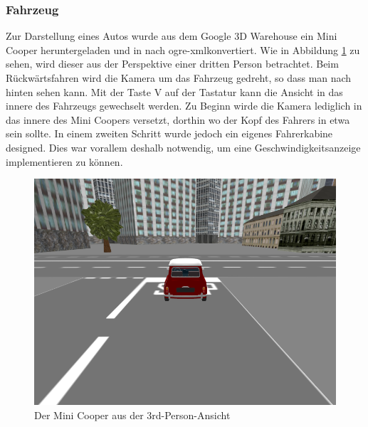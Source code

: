 \newpage
\subsubsection{Fahrzeug}
Zur Darstellung eines Autos wurde aus dem Google 3D Warehouse ein Mini Cooper heruntergeladen und in nach \gls{ogre-xml}konvertiert. Wie in Abbildung \ref{screenshot_minicooper} zu sehen, wird dieser aus der Perspektive einer dritten Person betrachtet. Beim Rückwärtsfahren wird die Kamera um das Fahrzeug gedreht, so dass man nach hinten sehen kann. Mit der Taste V auf der Tastatur kann die Ansicht in das innere des Fahrzeugs gewechselt werden. Zu Beginn wirde die Kamera lediglich in das innere des Mini Coopers versetzt, dorthin wo der Kopf des Fahrers in etwa sein sollte. In einem zweiten Schritt wurde jedoch ein eigenes Fahrerkabine designed. Dies war vorallem deshalb notwendig, um eine Geschwindigkeitsanzeige implementieren zu können. 
\begin{figure}[H]
\centering 
\includegraphics[width=1\linewidth]{src/screenshot_minicooper.png}
\caption{Der Mini Cooper aus der 3rd-Person-Ansicht} %
\label{screenshot_minicooper} %
\end{figure}

